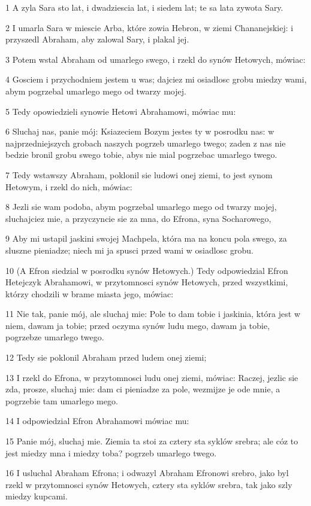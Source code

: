 \par 1 A zyla Sara sto lat, i dwadziescia lat, i siedem lat; te sa lata zywota Sary.
\par 2 I umarla Sara w miescie Arba, które zowia Hebron, w ziemi Chananejskiej: i przyszedl Abraham, aby zalowal Sary, i plakal jej.
\par 3 Potem wstal Abraham od umarlego swego, i rzekl do synów Hetowych, mówiac:
\par 4 Gosciem i przychodniem jestem u was; dajciez mi osiadlosc grobu miedzy wami, abym pogrzebal umarlego mego od twarzy mojej.
\par 5 Tedy opowiedzieli synowie Hetowi Abrahamowi, mówiac mu:
\par 6 Sluchaj nas, panie mój: Ksiazeciem Bozym jestes ty w posrodku nas: w najprzedniejszych grobach naszych pogrzeb umarlego twego; zaden z nas nie bedzie bronil grobu swego tobie, abys nie mial pogrzebac umarlego twego.
\par 7 Tedy wstawszy Abraham, poklonil sie ludowi onej ziemi, to jest synom Hetowym, i rzekl do nich, mówiac:
\par 8 Jezli sie wam podoba, abym pogrzebal umarlego mego od twarzy mojej, sluchajciez mie, a przyczyncie sie za mna, do Efrona, syna Socharowego,
\par 9 Aby mi ustapil jaskini swojej Machpela, która ma na koncu pola swego, za sluszne pieniadze; niech mi ja spusci przed wami w osiadlosc grobu.
\par 10 (A Efron siedzial w posrodku synów Hetowych.) Tedy odpowiedzial Efron Hetejczyk Abrahamowi, w przytomnosci synów Hetowych, przed wszystkimi, którzy chodzili w brame miasta jego, mówiac:
\par 11 Nie tak, panie mój, ale sluchaj mie: Pole to dam tobie i jaskinia, która jest w niem, dawam ja tobie; przed oczyma synów ludu mego, dawam ja tobie, pogrzebze umarlego twego.
\par 12 Tedy sie poklonil Abraham przed ludem onej ziemi;
\par 13 I rzekl do Efrona, w przytomnosci ludu onej ziemi, mówiac: Raczej, jezlic sie zda, prosze, sluchaj mie: dam ci pieniadze za pole, wezmijze je ode mnie, a pogrzebie tam umarlego mego.
\par 14 I odpowiedzial Efron Abrahamowi mówiac mu:
\par 15 Panie mój, sluchaj mie. Ziemia ta stoi za cztery sta syklów srebra; ale cóz to jest miedzy mna i miedzy toba? pogrzeb umarlego twego.
\par 16 I usluchal Abraham Efrona; i odwazyl Abraham Efronowi srebro, jako byl rzekl w przytomnosci synów Hetowych, cztery sta syklów srebra, tak jako szly miedzy kupcami.
